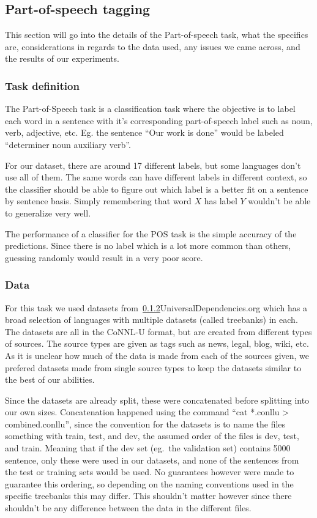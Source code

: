 
\subsection{Part-of-speech tagging}

This section will go into the details of the Part-of-speech task, what the
specifics are, considerations in regards to the data used, any issues we came
across, and the results of our experiments.

\subsubsection{Task definition}

The Part-of-Speech task is a classification task where the objective is to label
each word in a sentence with it's corresponding part-of-speech label such as
noun, verb, adjective, etc. Eg. the sentence ``Our work is done'' would be
labeled ``determiner noun auxiliary verb''.

For our dataset, there are around 17 different labels, but some languages don't
use all of them. The same words can have different labels in different context,
so the classifier should be able to figure out which label is a better fit on a
sentence by sentence basis. Simply remembering that word $X$ has label $Y$
wouldn't be able to generalize very well.

The performance of a classifier for the POS task is the simple accuracy of the
predictions. Since there is no label which is a lot more common than others,
guessing randomly would result in a very poor score. 

\subsubsection{Data}

For this task we used datasets from~\ref{}{UniversalDependencies.org} which has
a broad selection of languages with multiple datasets (called treebanks) in
each. The datasets are all in the CoNNL-U format, but are created from different
types of sources. The source types are given as tags such as news, legal, blog,
wiki, etc. As it is unclear how much of the data is made from each of the
sources given, we prefered datasets made from single source types to keep the
datasets similar to the best of our abilities.

Since the datasets are already split, these were concatenated before splitting
into our own sizes. Concatenation happened using the command ``cat *.conllu >
combined.conllu'', since the convention for the datasets is to name the files
something with train, test, and dev, the assumed order of the files is dev,
test, and train. Meaning that if the dev set (eg.\ the validation set) contains
5000 sentence, only these were used in our datasets, and none of the sentences
from the test or training sets would be used. No guarantees however were made to
guarantee this ordering, so depending on the naming conventions used in the
specific treebanks this may differ. This shouldn't matter however since there
shouldn't be any difference between the data in the different files.

